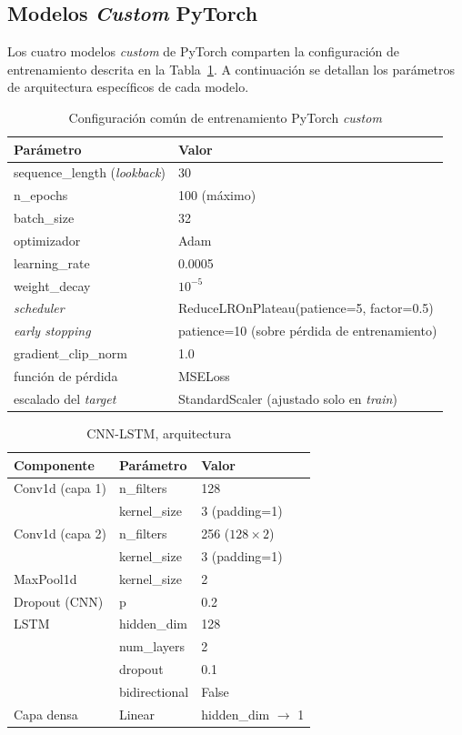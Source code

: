 \subsection{Modelos \textit{Custom} PyTorch}
\label{app:pytorch_hyperparams}

Los cuatro modelos \textit{custom} de PyTorch comparten la configuraci\'on de entrenamiento descrita en la Tabla~\ref{tab:pytorch_common}. A continuaci\'on se detallan los par\'ametros de arquitectura espec\'ificos de cada modelo.

\begin{table}[H]
\centering
\caption{Configuraci\'on com\'un de entrenamiento PyTorch \textit{custom}}
\label{tab:pytorch_common}
\small
\begin{tabular}{@{}lp{10cm}@{}}
\toprule
\textbf{Par\'ametro} & \textbf{Valor} \\
\midrule
sequence\_length (\textit{lookback}) & 30 \\
n\_epochs & 100 (m\'aximo) \\
batch\_size & 32 \\
optimizador & Adam \\
learning\_rate & 0.0005 \\
weight\_decay & $10^{-5}$ \\
\textit{scheduler} & ReduceLROnPlateau(patience=5, factor=0.5) \\
\textit{early stopping} & patience=10 (sobre p\'erdida de entrenamiento) \\
gradient\_clip\_norm & 1.0 \\
funci\'on de p\'erdida & MSELoss \\
escalado del \textit{target} & StandardScaler (ajustado solo en \textit{train}) \\
\bottomrule
\end{tabular}
\end{table}

\begin{table}[H]
\centering
\caption{CNN-LSTM, arquitectura}
\label{tab:hyper_cnnlstm}
\small
\begin{tabular}{@{}llp{7cm}@{}}
\toprule
\textbf{Componente} & \textbf{Par\'ametro} & \textbf{Valor} \\
\midrule
Conv1d (capa 1) & n\_filters & 128 \\
 & kernel\_size & 3 (padding=1) \\
Conv1d (capa 2) & n\_filters & 256 ($128 \times 2$) \\
 & kernel\_size & 3 (padding=1) \\
MaxPool1d & kernel\_size & 2 \\
Dropout (CNN) & p & 0.2 \\
\midrule
LSTM & hidden\_dim & 128 \\
 & num\_layers & 2 \\
 & dropout & 0.1 \\
 & bidirectional & False \\
\midrule
Capa densa & Linear & hidden\_dim $\to$ 1 \\
\bottomrule
\end{tabular}
\end{table}

